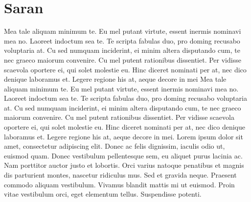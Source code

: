 \section{Saran}
Mea tale aliquam minimum te. Eu mel putant virtute, essent inermis nominavi mea no. Laoreet indoctum sea te. Te scripta fabulas duo, pro doming recusabo voluptaria at. Cu sed numquam inciderint, ei minim altera disputando cum, te nec graeco maiorum convenire.
Cu mel putent rationibus dissentiet. Per vidisse scaevola oportere ei, qui solet molestie eu. Hinc diceret nominati per at, nec dico denique laboramus et. Legere regione his at, aeque decore in mei
Mea tale aliquam minimum te. Eu mel putant virtute, essent inermis nominavi mea no. Laoreet indoctum sea te. Te scripta fabulas duo, pro doming recusabo voluptaria at. Cu sed numquam inciderint, ei minim altera disputando cum, te nec graeco maiorum convenire.
Cu mel putent rationibus dissentiet. Per vidisse scaevola oportere ei, qui solet molestie eu. Hinc diceret nominati per at, nec dico denique laboramus et. Legere regione his at, aeque decore in mei.
Lorem ipsum dolor sit amet, consectetur adipiscing elit. Donec ac felis dignissim, iaculis odio ut, euismod quam. Donec vestibulum pellentesque sem, eu aliquet purus lacinia ac. Nam porttitor auctor justo et lobortis. Orci varius natoque penatibus et magnis dis parturient montes, nascetur ridiculus mus. Sed et gravida neque. Praesent commodo aliquam vestibulum. Vivamus blandit mattis mi ut euismod. Proin vitae vestibulum orci, eget elementum tellus. Suspendisse potenti.\\